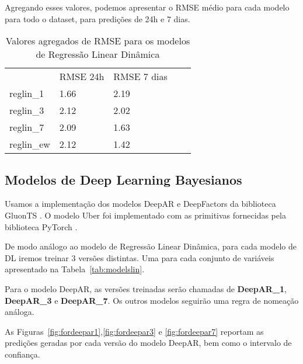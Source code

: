 Agregando esses valores, podemos apresentar o RMSE médio para cada modelo para
todo o dataset, para predições de 24h e 7 dias.

\begin{center}
  \begin{table}[]
    \centering
    \begin{tabular}{l|llll}
      \cline{2-3}
      & \multicolumn{1}{l|}{RMSE 24h} & \multicolumn{1}{l|}{RMSE 7 dias} &  \\ \cline{1-3}
      \multicolumn{1}{|l|}{reglin\_1} & 1.66                          & 2.19                             &  \\ \cline{1-1}
      \multicolumn{1}{|l|}{reglin\_3} & 2.12                          & 2.02                             &  \\ \cline{1-1}
      \multicolumn{1}{|l|}{reglin\_7} & 2.09                          & 1.63                             &  \\ \cline{1-1}
      \multicolumn{1}{|l|}{reglin\_ew} & 2.12                          & 1.42                            &  \\ \cline{1-1}
    \end{tabular}
    \caption{Valores agregados de RMSE para os modelos de Regressão Linear Dinâmica}

    \label{tb:rmse_exp}
  \end{table}
\end{center}



\subsection{Modelos de Deep Learning Bayesianos}


Usamos a implementação dos modelos DeepAR e DeepFactors da biblioteca GluonTS
\citep{gluonts}. O modelo Uber foi implementado com as primitivas fornecidas
pela biblioteca PyTorch \citep{pytorch}.

De modo análogo ao modelo de Regressão Linear Dinâmica, para
cada modelo de DL iremos treinar 3 versões distintas. Uma para cada conjunto de variáveis apresentado na Tabela~\ref{tab:modelslin}.


Para o modelo DeepAR, as versões treinadas serão chamadas de \textbf{DeepAR\_1},
\textbf{DeepAR\_3} e \textbf{DeepAR\_7}. Os outros modelos seguirão uma
regra de nomeação análoga.

As Figuras~\ref{fig:fordeepar1},\ref{fig:fordeepar3} e \ref{fig:fordeepar7} reportam as
predições geradas por cada versão do modelo DeepAR, bem como o intervalo de confiança. 

